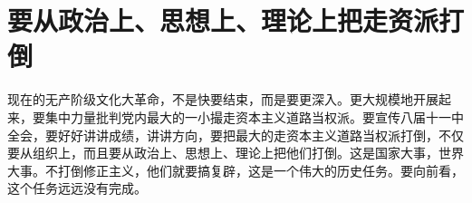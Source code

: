 \section[要从政治上、思想上、理论上把走资派打倒（一九六七年八月）]{要从政治上、思想上、理论上把走资派打倒}


现在的无产阶级文化大革命，不是快要结束，而是要更深入。更大规模地开展起来，要集中力量批判党内最大的一小撮走资本主义道路当权派。要宣传八届十一中全会，要好好讲讲成绩，讲讲方向，要把最大的走资本主义道路当权派打倒，不仅要从组织上，而且要从政治上、思想上、理论上把他们打倒。这是国家大事，世界大事。不打倒修正主义，他们就要搞复辟，这是一个伟大的历史任务。要向前看，这个任务远远没有完成。



